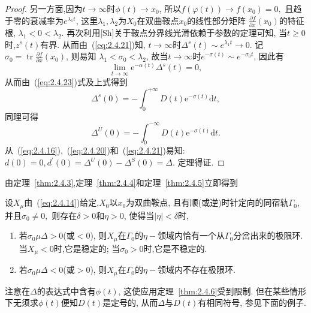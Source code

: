 \begin{proof}
  另一方面,因为$t\to \infty$时$\phi(t) \to x_0$,
  所以$f(\varphi(t)) \rightarrow f\left(x_{0}\right)=0,$
  且趋于零的衰减率为$e^{\lambda_1t}$,
  这里$\lambda_1,\lambda_2$为$X_0$在双曲鞍点$x_0$的线性部分矩阵
  $\frac{\partial f}{\partial x}\left(x_{0}\right)$的特征根,
  $\lambda_{1}<0<\lambda_2$.
  再次利用[Sh]关于鞍点分界线光滑依赖于参数的定理可知,
  当$t\geq0$时,$z^s(t)$有界.
  从而由~(\ref{eq:2.4.21})知,
  $t\to \infty$时$\Delta^{s}(t) \sim e^{\lambda_{1} t} \rightarrow 0$.
  记$\sigma_{0}=\operatorname{tr} \frac{\partial f}{\partial x}\left(x_{0}\right)$,
  则易知
  $\lambda_1<\sigma_0<\lambda_2$,
  故当$t \to \infty$时$e^{-\sigma(t)} \sim e^{-\sigma_{0} t}$,
  因此有
  $$
\lim _{t \rightarrow \infty} \mathrm{e}^{-\alpha(t)} \Delta^{s}(t)=0,
$$
从而由~(\ref{eq:2.4.23})式及上式得到
$$
\Delta^{s}(0)=-\int_{0}^{+\infty} D(t) \mathrm{e}^{-\sigma(t)} \mathrm{d} t,
$$
同理可得
$$
\Delta^{U}(0)=-\int_{0}^{-\infty} D(t) \mathrm{e}^{-\sigma(t)} \mathrm{d} t.
$$
从~(\ref{eq:2.4.16}),~(\ref{eq:2.4.20})和~(\ref{eq:2.4.21})易知:
$d(0)=0, d^{\prime}(0)=\Delta^{U}(0)-\Delta^{S}(0)=\Delta.$
定理得证.
\end{proof}

由定理~\ref{thm:2.4.3},定理~\ref{thm:2.4.4}和定理~\ref{thm:2.4.5}立即得到

\begin{theorem}
  \label{thm:2.4.6}
  设$X_{\mu}$由~(\ref{eq:2.4.14})给定,$X_0$以$x_0$为双曲鞍点,
  且有顺(或逆)时针定向的同宿轨$\Gamma_0$,
  并且$\sigma_0 \neq 0,$
  则存在$\delta >0$和$\eta >0$,
  使得当$|\eta|<\delta$时,
  \begin{enumerate}
  \item\label{item:23} 若$\sigma_{0} \mu \Delta>0$(或$<0$),
    则$X_{\mu}$在$\Gamma_0$的$\eta-$领域内恰有一个从$\Gamma_0$分岔出来的极限环.
    当$X_{\mu}<0$时,它是稳定的;
    当$\sigma_0>0$时,它是不稳定的.
  \item\label{item:24}
    若$\sigma_0\mu\Delta<0$(或$>0$),
    则$X_{\mu}$在$\Gamma_0$的$\eta-$领域内不存在极限环.
  \end{enumerate}
\end{theorem}

注意在$\Delta$的表达式中含有$\phi(t)$,
这使应用定理~\ref{thm:2.4.6}受到限制.
但在某些情形下无须求$\phi(t)$便知$D(t)$是定号的,
从而$\Delta$与$D(t)$有相同符号,
参见下面的例子.

